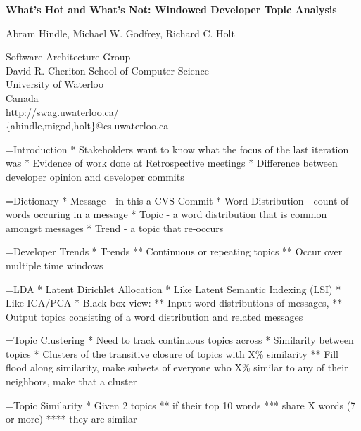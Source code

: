 \documentclass[titlepage,usenames,a4,landscape,semhelv]{seminar}
\author{
\names \\ 
{\small Software Architecture Group }\\
\small David R. Cheriton School of Computer Science\\
\small University of Waterloo\\
\small Canada\\
ahindle@cs.uwaterloo.ca
}
\newcommand{\gettitle}{What's Hot and What's Not: Windowed Developer Topic Analysis}
\newcommand{\gettitleproper}{\gettitle}
\newcommand{\names}{Abram Hindle, Michael W. Godfrey, Richard C. Holt}
\begin{document}
\pagestyle{fancy} %
\begin{slide}

\begin{center}
{\bf \LARGE \gettitleproper }

{\names } 

{\small Software Architecture Group }\\[-.5em]
{\small David R. Cheriton School of Computer Science}\\[-.5em]
{\small University of Waterloo}\\[-.5em]
{\small Canada}\\[-.5em]
{\small http://swag.uwaterloo.ca/}\\
\{ahindle,migod,holt\}@cs.uwaterloo.ca


\end{center}

=Introduction
* Stakeholders want to know what the focus of the last iteration was
* Evidence of work done at Retrospective meetings
* Difference between developer opinion and developer commits


=Dictionary
* Message - in this a CVS Commit
* Word Distribution - count of words occuring in a message
* Topic - a word distribution that is common amongst messages
* Trend - a topic that re-occurs


=Developer Trends
* Trends
** Continuous or repeating topics
** Occur over multiple time windows

=LDA
* Latent Dirichlet Allocation
* Like Latent Semantic Indexing (LSI)
* Like ICA/PCA
* Black box view:
** Input word distributions of messages, 
** Output topics consisting of a word distribution and related messages



=Topic Clustering 
* Need to track continuous topics across 
* Similarity between topics
* Clusters of the transitive closure of topics with X\% similarity
** Fill flood along similarity, make subsets of everyone who X\% similar to any of their neighbors, make that a cluster




=Topic Similarity
* Given 2 topics
** if their top 10 words 
*** share X words (7 or more)
****  they are similar






\end{slide}
\end{document}

